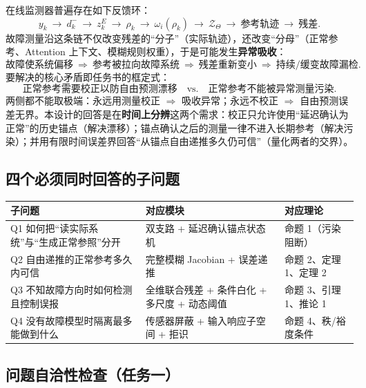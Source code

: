 \documentclass[11pt,a4paper]{ctexart}
\theoremstyle{remark}
\newcommand{\ZT}{\mathcal{Z}_{\Theta}}
\begin{document}
在线监测器普遍存在如下反馈环：
\begin{equation*}
y_k\ \to\ d_k^-\ \to\ z_k^{E}\ \to\ \rho_k\ \to\ \omega_i(\rho_k)\ \to\ \ZT\ \to\ \text{参考轨迹}\ \to\ \text{残差}.
\end{equation*}
故障测量沿这条链不仅改变残差的“分子”（实际轨迹），还改变“分母”（正常参考、Attention 上下文、模糊规则权重），于是可能发生\textbf{异常吸收}：
\begin{equation*}
\text{故障使系统偏移}\ \Rightarrow\ \text{参考被拉向故障系统}\ \Rightarrow\ \text{残差重新变小}\ \Rightarrow\ \text{持续/缓变故障漏检}.
\end{equation*}
要解决的核心矛盾即任务书的框定式：
\begin{equation*}
\boxed{\ \text{正常参考需要校正以防自由预测漂移}\quad\text{vs.}\quad\text{正常参考不能被异常测量污染}.\ }
\end{equation*}
两侧都不能取极端：永远用测量校正 $\Rightarrow$ 吸收异常；永远不校正 $\Rightarrow$ 自由预测误差无界。本设计的回答是在\textbf{时间上分辨}这两个需求：校正只允许使用“延迟确认为正常”的历史锚点（解决漂移）；锚点确认之后的测量一律不进入长期参考（解决污染）；并用有限时间误差界回答“从锚点自由递推多久仍可信”（量化两者的交界）。

\subsection{四个必须同时回答的子问题}

\begin{center}
\begin{tabular}{p{}p{}p{}}
\toprule
子问题 & 对应模块 & 对应理论 \\
\midrule
Q1 如何把“读实际系统”与“生成正常参照”分开 & 双支路 + 延迟确认锚点状态机 & 命题 1（污染阻断） \\
Q2 自由递推的正常参考多久内可信 & 完整模糊 Jacobian + 误差递推 & 命题 2、定理 1、定理 2 \\
Q3 不知故障方向时如何检测且控制误报 & 全维联合残差 + 条件白化 + 多尺度 + 动态阈值 & 命题 3、引理 1、推论 1 \\
Q4 没有故障模型时隔离最多能做到什么 & 传感器屏蔽 + 输入响应子空间 + 拒识 & 命题 4、秩/裕度条件 \\
\bottomrule
\end{tabular}
\end{center}

\subsection{问题自洽性检查（任务一）}
\end{document}
